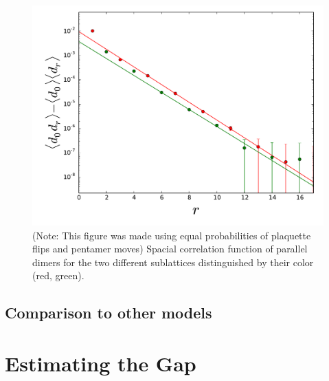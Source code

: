 \documentclass[twocolumn,prb,aps,floatfix,superscriptaddress]{revtex4-1}
\begin{document}
    \begin{figure}[htpb]
        \centering
        \includegraphics[width=0.8\linewidth]{spacial_dmr_cor.pdf}
        \caption{(Note: This figure was made using equal probabilities of plaquette flips and
        pentamer moves) Spacial correlation function of parallel dimers for the two different
        sublattices distinguished by their color (red, green).}
        \label{fig:spacial_dmr_cor}
    \end{figure}

    \subsection{Comparison to other models}

\section{Estimating the Gap}
\end{document}
